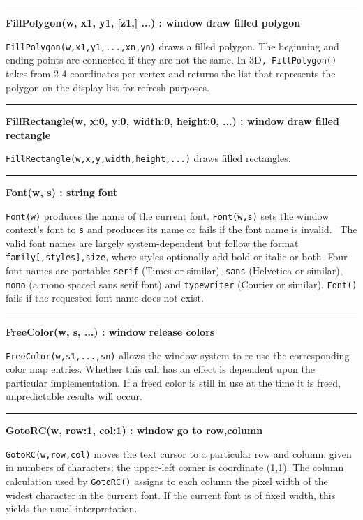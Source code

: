 \bigskip\hrule\vspace{0.1cm}
\noindent
{\bf FillPolygon(w, x1, y1, [z1,] ...) : window } \hfill {\bf draw filled polygon}

\noindent
\texttt{FillPolygon(w,x1,y1,...,xn,yn)} draws a filled polygon. The
beginning and ending points are connected if they are not the same. In
3D\texttt{, FillPolygon()} takes from 2-4 coordinates per vertex and
returns the list that represents the polygon on the display list for
refresh purposes. 

\bigskip\hrule\vspace{0.1cm}
\noindent
{\bf FillRectangle(w, x:0, y:0, width:0, height:0, ...) : window } \hfill {\bf draw filled rectangle}

\noindent
\texttt{FillRectangle(w,x,y,width,height,...)} draws filled rectangles.

\bigskip\hrule\vspace{0.1cm}
\noindent
{\bf Font(w, s) : string } \hfill {\bf font}

\noindent
\texttt{Font(w)} produces the name of the current font.
\texttt{Font(w,s)} sets the window context's font to
\texttt{s} and produces its name or fails if the font name is invalid.
\ The valid font names are largely system-dependent but follow the
format \texttt{family[,styles],size}, where styles optionally add bold
or italic or both. Four font names are portable: \texttt{serif} (Times
or similar), \texttt{sans} (Helvetica or similar), \texttt{mono} (a
mono spaced sans serif font) and \texttt{typewriter} (Courier or
similar). \texttt{Font()} fails if the requested font name does not
exist.

\bigskip\hrule\vspace{0.1cm}
\noindent
{\bf FreeColor(w, s, ...) : window } \hfill {\bf release colors}

\noindent
\texttt{FreeColor(w,s1,...,sn)} allows the window system to re-use the
corresponding color map entries. Whether this call has an effect is
dependent upon the particular implementation. If a freed color is
still in use at the time it is freed, unpredictable results will occur.

\bigskip\hrule\vspace{0.1cm}
\noindent
{\bf GotoRC(w, row:1, col:1) : window } \hfill {\bf go to row,column}

\noindent
\texttt{GotoRC(w,row,col)} moves the text cursor to a particular row and
column, given in numbers of characters; the upper-left corner is
coordinate (1,1). The column calculation used by \texttt{GotoRC()}
assigns to each column the pixel width of the widest character in the
current font. If the current font is of fixed width, this yields the
usual interpretation.

